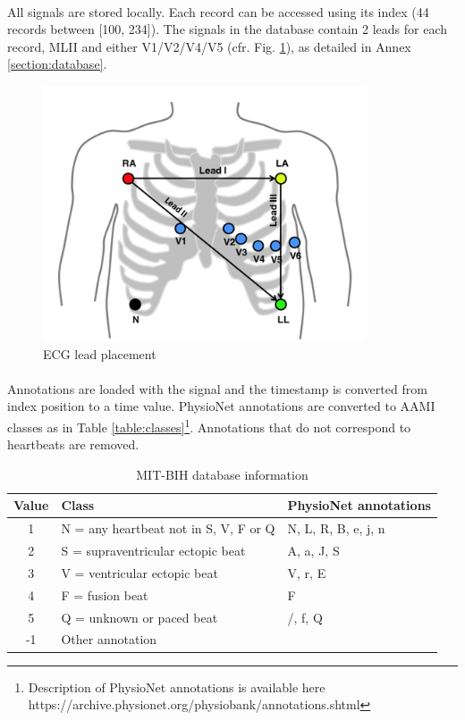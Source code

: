 \documentclass[a4paper,10pt,twoside]{article}
\begin{document}
\paragraph{}All signals are stored locally. Each record can be accessed using its index (44 records between [100, 234]). The signals in the database contain 2 leads for each record, MLII and either V1/V2/V4/V5 (cfr. Fig. \ref{fig:lead}), as detailed in Annex \ref{section:database}. 

\begin{figure}[!h]
\centering
\includegraphics[scale=1]{images/lead.PNG}
\caption{ECG lead placement}
\label{fig:lead}
\end{figure}

\paragraph{} Annotations are loaded with the signal and the timestamp is converted from index position to a time value. PhysioNet annotations are converted to AAMI classes as in Table \ref{table:classes}\footnote{Description of PhysioNet annotations is available here https://archive.physionet.org/physiobank/annotations.shtml}. Annotations that do not correspond to heartbeats are removed. 

\begin{table}[h!]
\centering
\caption{MIT-BIH database information}
\label{table:database}
 \begin{tabular}{c|l|l} 
 \hline
 Value & Class & PhysioNet annotations \\
 \hline
 1 & N = any heartbeat not in S, V, F or Q & N, L, R, B, e, j, n\\
 2 & S = supraventricular ectopic beat & A, a, J, S\\
 3 & V = ventricular ectopic beat& V, r, E \\
 4 & F = fusion beat& F\\
 5 & Q = unknown or paced beat& /, f, Q\\
 -1 & Other annotation & \\
 \hline
 \end{tabular}
\end{table}
\end{document}

